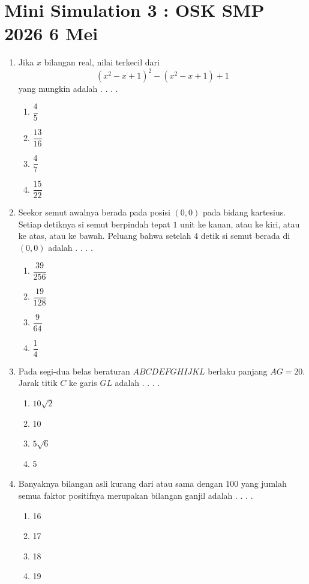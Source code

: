 \documentclass[12pt]{scrartcl}
\begin{document}
\renewcommand*\contentsname{Daftar Isi}
\tableofcontents

\newpage

\section*{Mini Simulation 3 : OSK SMP 2026 6 Mei}
\begin{enumerate}
    \item Jika $x$ bilangan real, nilai terkecil dari
    $$\left (x^2-x+1\right )^2 -\left (x^2-x+1\right )+1$$
    yang mungkin adalah . . . .
    \begin{enumerate}[label={(\Alph*)}]
        \item $\dfrac{4}{5}$ \item $\dfrac{13}{16}$ \item $\dfrac{4}{7}$ \item $\dfrac{15}{22}$
    \end{enumerate}

    \item Seekor semut awalnya berada pada posisi $(0, 0)$ pada bidang kartesius. Setiap detiknya si semut berpindah tepat $1$ unit ke kanan, atau ke kiri, atau ke atas, atau ke bawah. Peluang bahwa setelah $4$ detik si semut berada di $(0, 0)$ adalah . . . .
    \begin{enumerate}[label={(\Alph*)}]
        \item $\dfrac{39}{256}$ \item $\dfrac{19}{128}$ \item $\dfrac{9}{64}$ \item $\dfrac{1}{4}$
    \end{enumerate}

    \item Pada segi-dua belas beraturan $ABCDEFGHIJKL$ berlaku panjang $AG=20$. Jarak titik $C$ ke garis $GL$ adalah . . . .
    \begin{enumerate}[label={(\Alph*)}]
        \item $10\sqrt{2}$ \item 10 \item $5\sqrt{6}$ \item 5
    \end{enumerate}

    \item Banyaknya bilangan asli kurang dari atau sama dengan $100$ yang jumlah semua faktor positifnya merupakan bilangan ganjil adalah . . . .
    \begin{enumerate}[label={(\Alph*)}]
        \item 16 \item 17 \item 18 \item 19
    \end{enumerate}


\end{enumerate}
\end{document}
